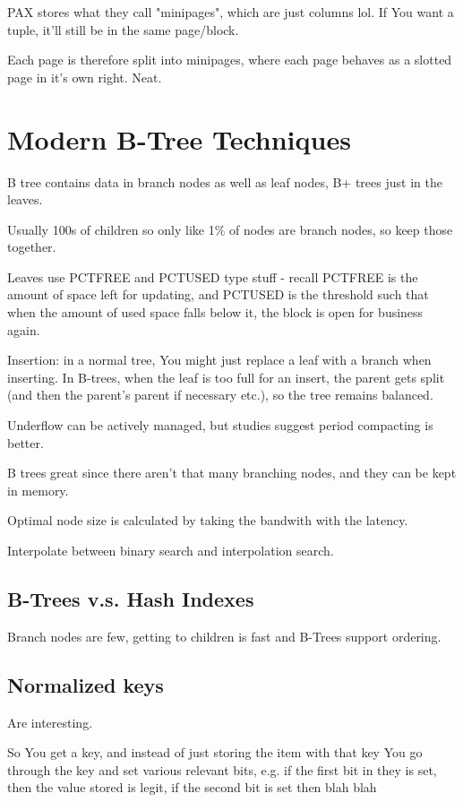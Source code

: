 \documentclass{article}
\begin{document}
	PAX stores what they call "minipages", which are just columns lol. If You want a tuple, it'll still be in the same page/block.
	
	Each page is therefore split into minipages, where each page behaves as a slotted page in it's own right. Neat.
	
\newpage
\section{Modern B-Tree Techniques}

	B tree contains data in branch nodes as well as leaf nodes, B+ trees just in the leaves.
	
	Usually 100s of children so only like 1\% of nodes are branch nodes, so keep those together.
	
	Leaves use PCTFREE and PCTUSED type stuff - recall PCTFREE is the amount of space left for updating, and PCTUSED is the threshold such that when the amount of used space falls below it, the block is open for business again.

	Insertion: in a normal tree, You might just replace a leaf with a branch when inserting. In B-trees, when the leaf is too full for an insert, the parent gets split (and then the parent's parent if necessary etc.), so the tree remains balanced.
	
	Underflow can be actively managed, but studies suggest period compacting is better.
	
	B trees great since there aren't that many branching nodes, and they can be kept in memory.
	
	Optimal node size is calculated by taking the bandwith with the latency.
	
	Interpolate between binary search and interpolation search.
	
	\subsection{B-Trees v.s. Hash Indexes}
	
		Branch nodes are few, getting to children is fast and B-Trees support ordering.
		
	\subsection{Normalized keys}
	
		Are interesting.
		
		So You get a key, and instead of just storing the item with that key You go through the key and set various relevant bits, e.g. if the first bit in they is set, then the value stored is legit, if the second bit is set then blah blah
		
\end{document}
